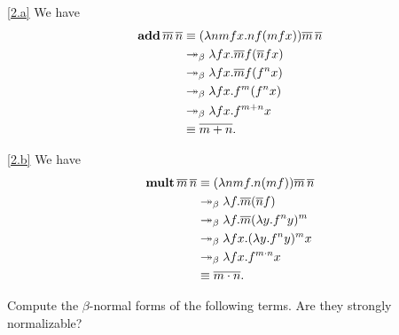 \documentclass{homework}
\begin{document}
\begin{solution}
  
    \ref{2.a} We have
    \begin{align*}
      \mathbf{add}\, \overline{m}\, \overline{n} &\equiv (\lambda nmfx.nf(mfx))\overline{m}\,\overline{n} \\
      &\twoheadrightarrow_{\beta} \lambda fx.\overline{m}f(\overline{n}fx) \\
      &\twoheadrightarrow_{\beta} \lambda fx.\overline{m}f(f^{n}x) \\
      &\twoheadrightarrow_{\beta} \lambda fx.f^{m}(f^{n}x) \\
      &\twoheadrightarrow_{\beta} \lambda fx.f^{m+n}x \\
      &\equiv \overline{m+n}.
    \end{align*}
  
    \ref{2.b} We have
    \begin{align*}
      \mathbf{mult}\, \overline{m}\, \overline{n} &\equiv (\lambda nmf.n(mf))\overline{m}\,\overline{n} \\
      &\twoheadrightarrow_{\beta} \lambda f.\overline{m}(\overline{n}f) \\
      &\twoheadrightarrow_{\beta} \lambda f.\overline{m}(\lambda y.f^n y)^m \\
      &\twoheadrightarrow_{\beta} \lambda fx.(\lambda y.f^n y)^m x \\
      &\twoheadrightarrow_{\beta} \lambda fx.f^{m\cdot n}x \\
      &\equiv \overline{m\cdot n}.
    \end{align*}

\end{solution}

\begin{problem}
  Compute the \(\beta\)-normal forms of the following terms.
  Are they strongly normalizable?
\end{problem}
\end{document}
